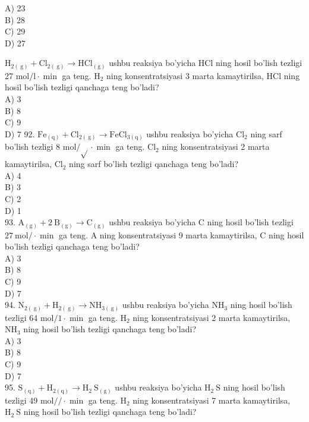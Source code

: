 A) 23\\
B) 28\\
C) 29\\
D) 27
  \item $\mathrm{H}_{2(\mathrm{~g})}+\mathrm{Cl}_{2(\mathrm{~g})} \rightarrow \mathrm{HCl}_{(\mathrm{g})}$ ushbu reaksiya bo'yicha HCl ning hosil bo'lish tezligi 27 $\mathrm{mol} / \mathrm{l} \cdot \min$ ga teng. $\mathrm{H}_{2}$ ning konsentratsiyasi 3 marta kamaytirilsa, HCl ning hosil bo'lish tezligi qanchaga teng bo'ladi?\\
A) 3\\
B) 8\\
C) 9\\
D) 7
92. $\mathrm{Fe}{ }_{(\mathrm{q})}+\mathrm{Cl}_{2(\mathrm{~g})} \rightarrow \mathrm{FeCl}_{3(\mathrm{q})}$ ushbu reaksiya bo'yicha $\mathrm{Cl}_{2}$ ning sarf bo'lish tezligi 8 $\mathrm{mol} / \sqrt{ } \cdot \min$ ga teng. $\mathrm{Cl}_{2}$ ning konsentratsiyasi 2 marta kamaytirilsa, $\mathrm{Cl}_{2}$ ning sarf bo'lish tezligi qanchaga teng bo'ladi?\\
A) 4\\
B) 3\\
C) 2\\
D) 1\\
93. $\mathrm{A}_{(\mathrm{g})}+2 \mathrm{~B}_{(\mathrm{g})} \rightarrow \mathrm{C}_{(\mathrm{g})}$ ushbu reaksiya bo'yicha C ning hosil bo'lish tezligi $27 \mathrm{~mol} / \cdot \min$ ga teng. A ning konsentratsiyasi 9 marta kamaytirilsa, C ning hosil bo'lish tezligi qanchaga teng bo'ladi?\\
A) 3\\
B) 8\\
C) 9\\
D) 7\\
94. $\mathrm{N}_{2(\mathrm{~g})}+\mathrm{H}_{2(\mathrm{~g})} \rightarrow \mathrm{NH}_{3(\mathrm{~g})}$ ushbu reaksiya bo'yicha $\mathrm{NH}_{3}$ ning hosil bo'lish tezligi 64 $\mathrm{mol} / 1 \cdot \min$ ga teng. $\mathrm{H}_{2}$ ning konsentratsiyasi 2 marta kamaytirilsa, $\mathrm{NH}_{3}$ ning hosil bo'lish tezligi qanchaga teng bo'ladi?\\
A) 3\\
B) 8\\
C) 9\\
D) 7\\
95. $\mathrm{S}_{(\mathrm{q})}+\mathrm{H}_{2(\mathrm{q})} \rightarrow \mathrm{H}_{2} \mathrm{~S}_{(\mathrm{g})}$ ushbu reaksiya bo'yicha $\mathrm{H}_{2} \mathrm{~S}$ ning hosil bo'lish tezligi 49 $\mathrm{mol} / / \cdot \min$ ga teng. $\mathrm{H}_{2}$ ning konsentratsiyasi 7 marta kamaytirilsa, $\mathrm{H}_{2} \mathrm{~S}$ ning hosil bo'lish tezligi qanchaga teng bo'ladi?\\
